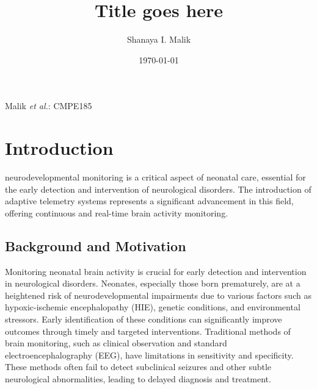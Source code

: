 \documentclass[12pt,journal,compsoc]{IEEEtran}
\begin{document}
\title{Title goes here}
\author{Shanaya I. Malik}


\date{\today}

%
{Malik \MakeLowercase{\textit{et al.}}: CMPE185}



\maketitle

 
\section{Introduction}

 neurodevelopmental monitoring is a critical aspect of neonatal care, essential for the early detection and intervention of neurological disorders. The introduction of adaptive telemetry systems represents a significant advancement in this field, offering continuous and real-time brain activity monitoring. 

\subsection{Background and Motivation}
Monitoring neonatal brain activity is crucial for early detection and intervention in neurological disorders. Neonates, especially those born prematurely, are at a heightened risk of neurodevelopmental impairments due to various factors such as hypoxic-ischemic encephalopathy (HIE), genetic conditions, and environmental stressors. Early identification of these conditions can significantly improve outcomes through timely and targeted interventions. Traditional methods of brain monitoring, such as clinical observation and standard electroencephalography (EEG), have limitations in sensitivity and specificity. These methods often fail to detect subclinical seizures and other subtle neurological abnormalities, leading to delayed diagnosis and treatment.
\end{document}
